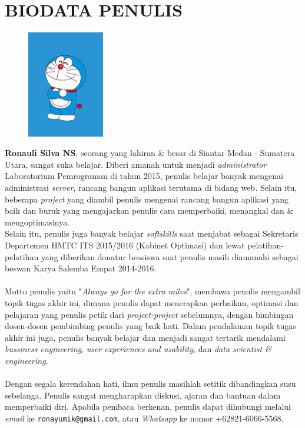 \chapter{BIODATA PENULIS}
		\begin{figure}
			\includegraphics[width=0.3\textwidth]{images/foto-diri.jpg}
		\end{figure}
		\textbf{Ronauli Silva NS}, seorang yang lahiran \& besar di Siantar Medan - Sumatera Utara, sangat suka belajar. Diberi amanah untuk menjadi \textit{administrator} Laboratorium Pemrograman di tahun 2015, penulis belajar banyak mengenai administrasi \textit{server}, rancang bangun aplikasi terutama di bidang web. Selain itu, beberapa \textit{project} yang diambil penulis mengenai rancang bangun aplikasi yang baik dan buruk yang mengajarkan penulis cara memperbaiki, menangkal dan \& mengoptimasinya.\\
		Selain itu, penulis juga banyak belajar \textit{softskills} saat menjabat sebagai Sekretaris Departemen HMTC ITS 2015/2016 (Kabinet Optimasi) dan lewat pelatihan-pelatihan yang diberikan donatur beasiswa saat penulis masih diamanahi sebagai beswan Karya Salemba Empat 2014-2016.\\ \\
		Motto penulis yaitu "\textit{Always go for the extra miles}", membawa penulis mengambil topik tugas akhir ini, dimana penulis dapat menerapkan perbaikan, optimasi dan pelajaran yang penulis petik dari \textit{project-project} sebelumnya, dengan bimbingan dosen-dosen pembimbing penulis yang baik hati. Dalam pendalaman topik tugas akhir ini juga, penulis banyak belajar dan menjadi sangat tertarik mendalami \textit{bussiness engineering}, \textit{user experiences and usability}, dan \textit{data scientist \& engineering}. \\ \\
		Dengan segala kerendahan hati, ilmu penulis masihlah setitik dibandingkan susu sebelanga. Penulis sangat mengharapkan diskusi, ajaran dan bantuan dalam memperbaiki diri. Apabila pembaca berkenan, penulis dapat dihubungi melalui \textit{email} ke \texttt{ronayumik@gmail.com}, atau \textit{Whatsapp} ke nomor +62821-6066-5568.


